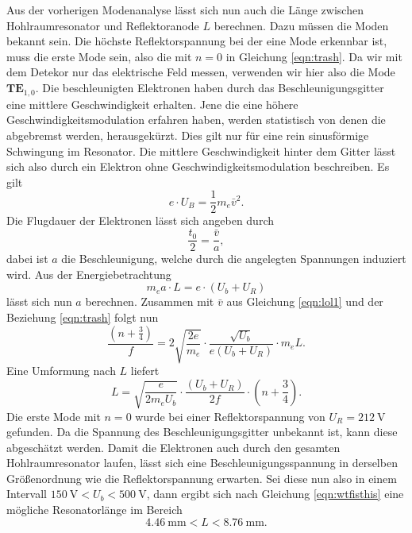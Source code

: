 \newline
Aus der vorherigen Modenanalyse lässt sich nun auch die Länge zwischen Hohlraumresonator und Reflektoranode $L$ berechnen. Dazu müssen die Moden bekannt sein. Die höchste Reflektorspannung bei der eine Mode erkennbar ist, muss die
erste Mode sein, also die mit $n=0$ in Gleichung \ref{eqn:trash}. Da wir mit dem Detekor nur das elektrische Feld messen, verwenden wir hier also die Mode $\textbf{TE}_{1,0}$.
Die beschleunigten Elektronen haben durch das Beschleunigungsgitter eine mittlere Geschwindigkeit erhalten. Jene die eine höhere Geschwindigkeitsmodulation erfahren haben, werden statistisch von denen 
die abgebremst werden, herausgekürzt. Dies gilt nur für eine rein sinusförmige Schwingung im Resonator. Die mittlere Geschwindigkeit hinter dem Gitter lässt sich also durch ein Elektron ohne Geschwindigkeitsmodulation 
beschreiben. Es gilt
\begin{equation}
    \label{eqn:lol1}
e \cdot U_{B} = \frac{1}{2}m_e \bar{v}^2.
\end{equation}
Die Flugdauer der Elektronen lässt sich angeben durch
\begin{equation}
\frac{t_0}{2} = \frac{\bar{v}}{a},
\end{equation}
dabei ist $a$ die Beschleunigung, welche durch die angelegten Spannungen induziert wird. Aus der Energiebetrachtung
\begin{equation}
m_e a \cdot L = e \cdot (U_b + U_R)
\end{equation}
lässt sich nun $a$ berechnen. Zusammen mit $\bar{v}$ aus Gleichung \ref{eqn:lol1} und der Beziehung \ref{eqn:trash} folgt nun
\begin{equation*}
\frac{\left(n + \frac{3}{4}\right)}{f} = 2 \sqrt{\frac{2e}{m_e}}\cdot \frac{\sqrt{U_b}}{e (U_b + U_R)} \cdot m_e L.
\end{equation*}
Eine Umformung nach $L$ liefert 
\begin{equation}
    \label{eqn:wtfisthis}
L =  \sqrt{\frac{e}{2 m_e U_b}} \cdot \frac{(U_b + U_R)}{2f} \cdot \left(n + \frac{3}{4}\right).
\end{equation}
Die erste Mode mit $n = 0$ wurde bei einer Reflektorspannung von $U_R = \SI{212}{\volt}$ gefunden. Da die Spannung des Beschleunigungsgitter unbekannt ist, kann diese abgeschätzt werden.
Damit die Elektronen auch durch den gesamten Hohlraumresonator laufen, lässt sich eine Beschleunigungsspannung in derselben Größenordnung wie die Reflektorspannung erwarten. 
Sei diese nun also in einem Intervall $\SI{150}{\volt} < U_b < \SI{500}{\volt}$, dann ergibt sich nach Gleichung \ref{eqn:wtfisthis} eine mögliche Resonatorlänge im Bereich
\begin{equation}
   \SI{4.46}{\milli\meter} < L < \SI{8.76}{\milli\meter}.
\end{equation}

